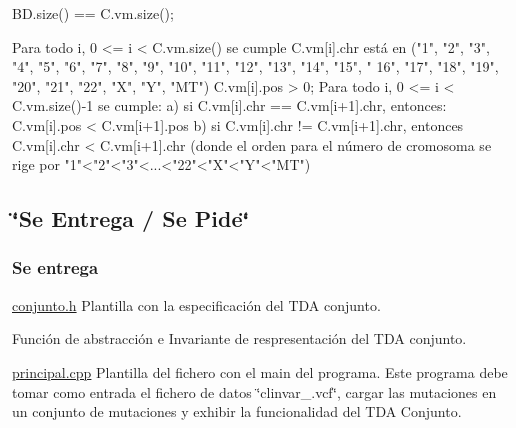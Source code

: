 \begin{DoxyCode}
BD.size() == C.vm.size();

Para todo i, 0 <= i < C.vm.size() se cumple
    C.vm[i].chr está en (\textcolor{stringliteral}{"1"}, \textcolor{stringliteral}{"2"}, \textcolor{stringliteral}{"3"}, \textcolor{stringliteral}{"4"}, \textcolor{stringliteral}{"5"}, \textcolor{stringliteral}{"6"}, \textcolor{stringliteral}{"7"}, \textcolor{stringliteral}{"8"}, \textcolor{stringliteral}{"9"}, \textcolor{stringliteral}{"10"}, \textcolor{stringliteral}{"11"}, \textcolor{stringliteral}{"12"}, \textcolor{stringliteral}{"13"}, \textcolor{stringliteral}{"14"}, \textcolor{stringliteral}{"15"}, \textcolor{stringliteral}{"
      16"}, \textcolor{stringliteral}{"17"}, \textcolor{stringliteral}{"18"}, \textcolor{stringliteral}{"19"}, \textcolor{stringliteral}{"20"}, \textcolor{stringliteral}{"21"}, \textcolor{stringliteral}{"22"}, \textcolor{stringliteral}{"X"}, \textcolor{stringliteral}{"Y"}, \textcolor{stringliteral}{"MT"})
  C.vm[i].pos > 0;
Para todo i, 0 <= i < C.vm.size()-1 se cumple:
  a) si C.vm[i].chr == C.vm[i+1].chr, entonces: C.vm[i].pos < C.vm[i+1].pos
  b) si C.vm[i].chr != C.vm[i+1].chr, entonces  C.vm[i].chr < C.vm[i+1].chr 
  (donde el orden para el número de cromosoma se rige por "1"<"2"<"3"<...<"22"<"X"<"Y"<"MT")
\end{DoxyCode}
\hypertarget{index_sec_tar}{}\subsection{\char`\"{}\+Se Entrega / Se Pide\char`\"{}}\label{index_sec_tar}
\hypertarget{index_ssEntrega}{}\subsubsection{Se entrega}\label{index_ssEntrega}
\begin{DoxyItemize}
\item \hyperlink{conjunto_8h}{conjunto.\+h} Plantilla con la especificación del T\+DA conjunto. \item Función de abstracción e Invariante de respresentación del T\+DA conjunto. \item \hyperlink{principal_8cpp}{principal.\+cpp} Plantilla del fichero con el main del programa. Este programa debe tomar como entrada el fichero de datos \char`\"{}clinvar\+\_.\+vcf\char`\"{}, cargar las mutaciones en un conjunto de mutaciones y exhibir la funcionalidad del T\+DA Conjunto.\end{DoxyItemize}
